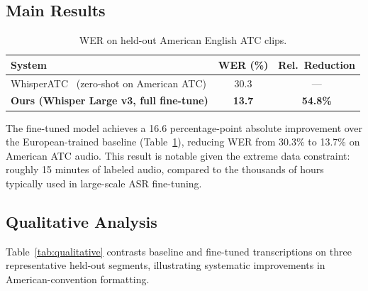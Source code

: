 \documentclass[11pt,a4paper]{article}
\begin{document}
\subsection{Main Results}

\begin{table}[h]
\centering
\caption{WER on held-out American English ATC clips.}
\label{tab:mainresults}
\begin{tabular}{lcc}
\toprule
\textbf{System} & \textbf{WER (\%)} & \textbf{Rel.\ Reduction} \\
\midrule
WhisperATC~\cite{vandoorn2024whisperatc} (zero-shot on American ATC) & 30.3 & --- \\
\textbf{Ours (Whisper Large v3, full fine-tune)}  & \textbf{13.7} & \textbf{54.8\%} \\
\bottomrule
\end{tabular}
\end{table}

The fine-tuned model achieves a 16.6 percentage-point absolute improvement
over the European-trained baseline (Table~\ref{tab:mainresults}), reducing
WER from 30.3\% to 13.7\% on American ATC audio. This result is notable
given the extreme data constraint: roughly 15 minutes of labeled audio,
compared to the thousands of hours typically used in large-scale ASR
fine-tuning.

\subsection{Qualitative Analysis}

Table~\ref{tab:qualitative} contrasts baseline and fine-tuned transcriptions
on three representative held-out segments, illustrating systematic improvements
in American-convention formatting.
\end{document}
